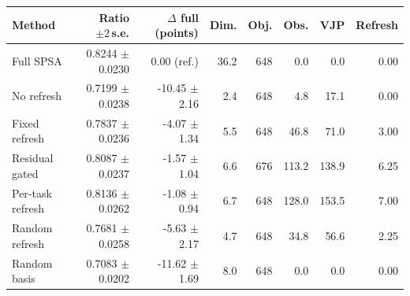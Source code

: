 \begin{tabular}{lrrrrrrr}
\toprule
Method & Ratio $\pm2\,$s.e. & $\Delta$ full (points) & Dim. & Obj. & Obs. & VJP & Refresh \\
\midrule
Full SPSA & 0.8244 $\pm$ 0.0230 & 0.00 (ref.) & 36.2 & 648 & 0.0 & 0.0 & 0.00 \\
No refresh & 0.7199 $\pm$ 0.0238 & -10.45 $\pm$ 2.16 & 2.4 & 648 & 4.8 & 17.1 & 0.00 \\
Fixed refresh & 0.7837 $\pm$ 0.0236 & -4.07 $\pm$ 1.34 & 5.5 & 648 & 46.8 & 71.0 & 3.00 \\
Residual gated & 0.8087 $\pm$ 0.0237 & -1.57 $\pm$ 1.04 & 6.6 & 676 & 113.2 & 138.9 & 6.25 \\
Per-task refresh & 0.8136 $\pm$ 0.0262 & -1.08 $\pm$ 0.94 & 6.7 & 648 & 128.0 & 153.5 & 7.00 \\
Random refresh & 0.7681 $\pm$ 0.0258 & -5.63 $\pm$ 2.17 & 4.7 & 648 & 34.8 & 56.6 & 2.25 \\
Random basis & 0.7083 $\pm$ 0.0202 & -11.62 $\pm$ 1.69 & 8.0 & 648 & 0.0 & 0.0 & 0.00 \\
\bottomrule
\end{tabular}
